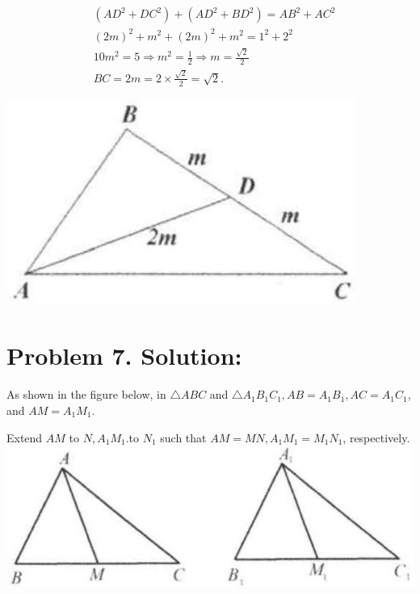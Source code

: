 \documentclass[10pt]{article}
\begin{document}
\[
\begin{aligned}
& \left(A D^{2}+D C^{2}\right)+\left(A D^{2}+B D^{2}\right)=A B^{2}+A C^{2} \\
& (2 m)^{2}+m^{2}+(2 m)^{2}+m^{2}=1^{2}+2^{2} \\
& 10 m^{2}=5 \Rightarrow m^{2}=\frac{1}{2} \Rightarrow m=\frac{\sqrt{2}}{2} \\
& B C=2 m=2 \times \frac{\sqrt{2}}{2}=\sqrt{2} .
\end{aligned}
\]

\begin{center}
\includegraphics[max width=\textwidth]{2025_04_17_97bc1f7e44d93c271a88g-031(2)}
\end{center}

\section*{Problem 7. Solution:}
As shown in the figure below, in \(\triangle A B C\) and \(\triangle A_{1} B_{1} C_{1}, A B=A_{1} B_{1}, A C=A_{1} C_{1}\), and \(A M=A_{1} M_{1}\).

Extend \(A M\) to \(N, A_{1} M_{1}\).to \(N_{1}\) such that \(A M=M N, A_{1} M_{1}=M_{1} N_{1}\), respectively.\\
\includegraphics[max width=\textwidth, center]{2025_04_17_97bc1f7e44d93c271a88g-031}
\end{document}

